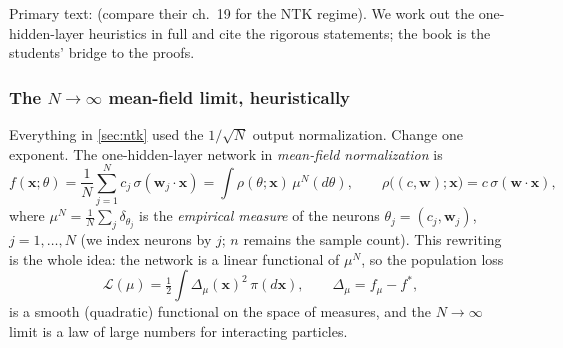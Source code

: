 \documentclass[11pt]{article}
\newcommand{\bv}[1]{\boldsymbol{#1}}
\begin{document}
Primary text: \cite[ch.~20]{spiliopoulos2025foundations} (compare their
ch.~19 for the NTK regime). We work out the one-hidden-layer heuristics in
full and cite the rigorous statements; the book is the students' bridge to
the proofs.

\subsubsection{The $N\to\infty$ mean-field limit, heuristically}

Everything in \cref{sec:ntk} used the $1/\sqrt{N}$ output normalization.
Change one exponent. The one-hidden-layer network in \emph{mean-field
normalization} is
\begin{equation}
  f(\bv{x};\theta) = \frac{1}{N}\sum_{j=1}^{N} c_j\,
  \sigma(\bv{w}_j\cdot\bv{x})
  = \int \rho(\theta;\bv{x})\,\mu^N(d\theta),
  \qquad
  \rho\bigl((c,\bv{w});\bv{x}\bigr) = c\,\sigma(\bv{w}\cdot\bv{x}),
\end{equation}
where $\mu^N = \frac1N \sum_j \delta_{\theta_j}$ is the \emph{empirical
measure} of the neurons $\theta_j = (c_j, \bv{w}_j)$, $j = 1, \dots, N$ (we index neurons by $j$; $n$ remains the sample count). This rewriting is the
whole idea: the network is a linear functional of $\mu^N$, so the population
loss
\begin{equation}
  \mathcal{L}(\mu) = \tfrac12 \int \Delta_\mu(\bv{x})^2\, \pi(d\bv{x}),
  \qquad \Delta_\mu = f_\mu - f^{*},
\end{equation}
is a smooth (quadratic) functional on the space of measures, and the
$N \to \infty$ limit is a law of large numbers for interacting particles.
\end{document}
